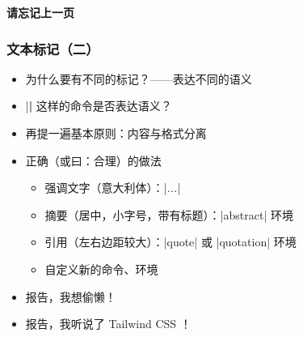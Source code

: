 \begin{frame}[standout]
  \huge \textbf{请忘记上一页}
\end{frame}

\begin{frame}[fragile]
\frametitle{文本标记（二）}
\begin{itemize}
  \item 为什么要有不同的标记？\pause\mbox{}——表达不同的\alert{语义} \pause
  \item |\textbf| 这样的命令是否表达语义？ \pause
  \item 再提一遍基本原则：\alert{内容与格式分离} \pause
  \item 正确（或曰：合理）的做法

    \begin{itemize}
      \item 强调文字（意大利体）：|\emph{...}|
      \item 摘要（居中，小字号，带有标题）：|abstract| 环境
      \item 引用（左右边距较大）：|quote| 或 |quotation| 环境
      \item 自定义新的命令、环境
    \end{itemize} \pause

  \item 报告，我想偷懒！
  \item 报告，我听说了 Tailwind CSS ！
\end{itemize}
\end{frame}

